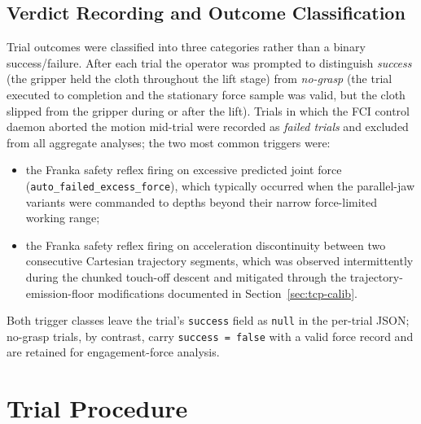 \subsection{Verdict Recording and Outcome Classification}
\label{sec:verdict-recording}

Trial outcomes were classified into three categories rather than a binary
success/failure. After each trial the operator was prompted to distinguish
\emph{success} (the gripper held the cloth throughout the lift stage) from
\emph{no-grasp} (the trial executed to completion and the stationary
force sample was valid, but the cloth slipped from the gripper during
or after the lift). Trials in which the FCI control daemon aborted the
motion mid-trial were recorded as \emph{failed trials} and excluded
from all aggregate analyses; the two most common triggers were:
\begin{itemize}
  \item the Franka safety reflex firing on excessive predicted joint
        force (\texttt{auto\_failed\_excess\_force}), which typically
        occurred when the parallel-jaw variants were commanded to
        depths beyond their narrow force-limited working range;
  \item the Franka safety reflex firing on acceleration discontinuity
        between two consecutive Cartesian trajectory segments, which
        was observed intermittently during the chunked touch-off
        descent and mitigated through the trajectory-emission-floor
        modifications documented in Section~\ref{sec:tcp-calib}.
\end{itemize}
Both trigger classes leave the trial's \texttt{success} field as
\texttt{null} in the per-trial JSON; no-grasp trials, by contrast,
carry \texttt{success = false} with a valid force record and are
retained for engagement-force analysis.

\section{Trial Procedure}

